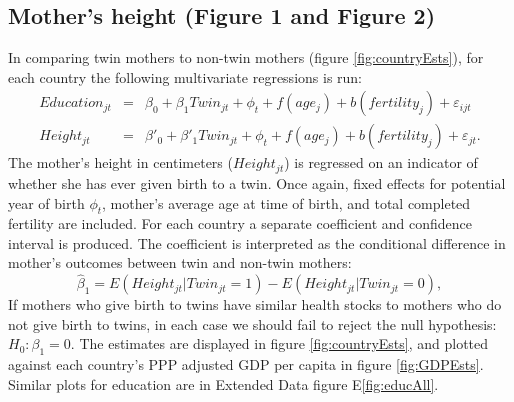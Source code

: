 \documentclass{nature}
\begin{document}
\begin{linenumbers}
\subsection{Mother's height (Figure 1 and Figure 2)}
In comparing twin mothers to non-twin mothers (figure \ref{fig:countryEsts}), for each country the following multivariate regressions is run:
\begin{eqnarray}
  Education_{jt}&=&\beta_0 + \beta_1 Twin_{jt} + \phi_t + f(age_j) + b(fertility_j) + \varepsilon_{ijt} \\
  Height_{jt}&=&\beta'_0 + \beta'_1 Twin_{jt} + \phi_t + f(age_j) + b(fertility_j) + \varepsilon_{jt}.
\end{eqnarray}
The mother's height in centimeters ($Height_{jt}$) is regressed on an indicator of whether she has ever given birth to a twin.  Once again, fixed effects for potential year of birth $\phi_t$, mother's average age at time of birth, and total completed fertility are included.  For each country a separate coefficient and confidence interval is produced.  The coefficient is interpreted as the conditional difference in mother's outcomes between twin and non-twin mothers:
\[
\hat\beta_1 = E(Height_{jt}| Twin_{jt}=1) - E(Height_{jt}| Twin_{jt}=0),
\]
 If mothers who give birth to twins have similar health stocks to mothers who do not give birth to twins, in each case we should fail to reject the null hypothesis: $H_0: \beta_1=0$.  The estimates are displayed in figure \ref{fig:countryEsts}, and plotted against each country's PPP adjusted GDP per capita in figure \ref{fig:GDPEsts}.  Similar plots for education are in Extended Data figure E\ref{fig:educAll}.%


\end{linenumbers}
\end{document}

